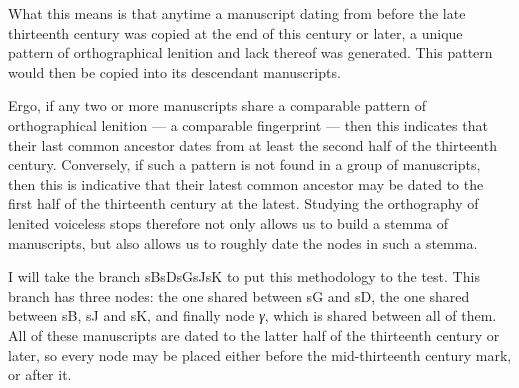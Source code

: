 What this means is that anytime a manuscript dating from before the late thirteenth century was copied at the end of this century or later, a unique pattern of orthographical lenition and lack thereof was generated. This pattern would then be copied into its descendant manuscripts.

Ergo, if any two or more manuscripts share a comparable pattern of orthographical lenition --- a comparable fingerprint --- then this indicates that their last common ancestor dates from at least the second half of the thirteenth century. Conversely, if such a pattern is not found in a group of manuscripts, then this is indicative that their latest common ancestor may be dated to the first half of the thirteenth century at the latest. Studying the orthography of lenited voiceless stops therefore not only allows us to build a stemma of manuscripts, but also allows us to roughly date the nodes in such a stemma.


I will take the branch \gls{sB}\gls{sD}\gls{sG}\gls{sJ}\gls{sK}
to put this methodology to the test. This branch has three nodes: the one shared between \gls{sG} and \gls{sD}, the one shared between \gls{sB}, \gls{sJ} and \gls{sK}, and finally node \textit{γ}, which is shared between all of them. All of these manuscripts are dated to the latter half of the thirteenth century or later, so every node may be placed either before the mid-thirteenth century mark, or after it.

